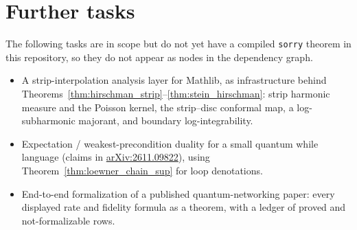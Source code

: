 \chapter{Further tasks}

The following tasks are in scope but do not yet have a compiled
\texttt{sorry} theorem in this repository, so they do not appear as nodes in
the dependency graph.

\begin{itemize}
  \item A strip-interpolation analysis layer for Mathlib, as infrastructure
    behind Theorems~\ref{thm:hirschman_strip}--\ref{thm:stein_hirschman}:
    strip harmonic measure and the Poisson kernel, the strip--disc conformal
    map, a log-subharmonic majorant, and boundary log-integrability.
  \item Expectation / weakest-precondition duality for a small quantum while
    language (claims in \href{https://arxiv.org/abs/2611.09822}{arXiv:2611.09822}),
    using Theorem~\ref{thm:loewner_chain_sup} for loop denotations.
  \item End-to-end formalization of a published quantum-networking paper:
    every displayed rate and fidelity formula as a theorem, with a ledger of
    proved and not-formalizable rows.
\end{itemize}

